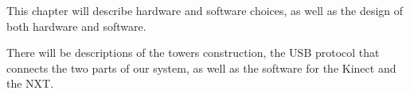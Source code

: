 This chapter will describe hardware and software choices, as well as the design of both hardware and software.

There will be descriptions of the towers construction, the USB protocol that connects the two parts of our system, as well as the software for the Kinect and the NXT.